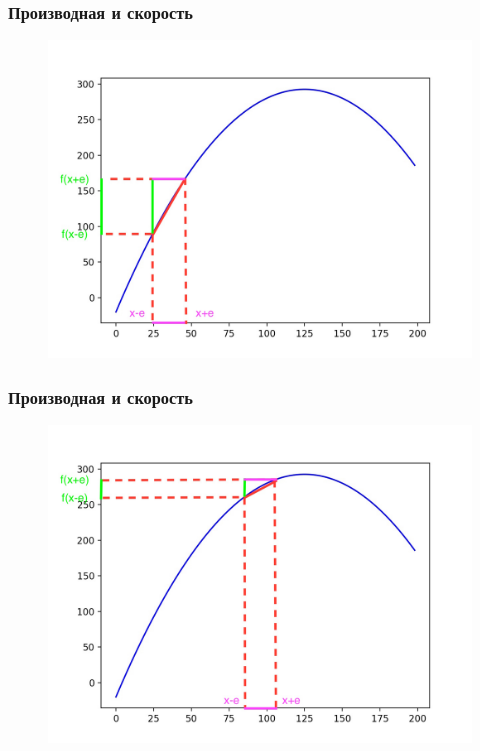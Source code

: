\documentclass[fullscreen=true, bookmarks=false]{beamer} %
\begin{document}

\begin{frame}{}
\frametitle{Производная и скорость}
\begin{figure}[]
\includegraphics[scale=0.22]{der1} 
\end{figure}
\end{frame}


\begin{frame}{}
\frametitle{Производная и скорость}
\begin{figure}[]
\includegraphics[scale=0.22]{der2} 
\end{figure}
\end{frame}
\end{document}
